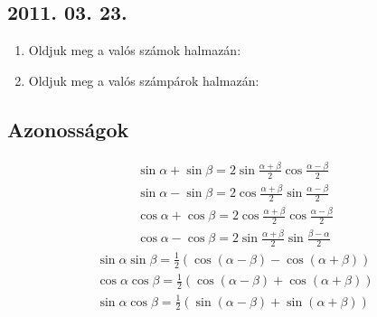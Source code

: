 \subsection*{2011. 03. 23.}
\begin{enumerate}
\item Oldjuk meg a valós számok halmazán:
\item Oldjuk meg a valós számpárok halmazán:
\end{enumerate}

\subsection*{Azonosságok} %
\begin{gather*}
\sin\alpha+\sin\beta=2\sin\frac{\alpha+\beta}{2}\cos\frac{\alpha-\beta}{2}\\
\sin\alpha-\sin\beta=2\cos\frac{\alpha+\beta}{2}\sin\frac{\alpha-\beta}{2}\\
\cos\alpha+\cos\beta=2\cos\frac{\alpha+\beta}{2}\cos\frac{\alpha-\beta}{2}\\
\cos\alpha-\cos\beta=2\sin\frac{\alpha+\beta}{2}\sin\frac{\beta-\alpha}{2}
\end{gather*}
\begin{gather*}
\sin\alpha\sin\beta=\frac12(\cos(\alpha-\beta)-\cos(\alpha+\beta))\\
\cos\alpha\cos\beta=\frac12(\cos(\alpha-\beta)+\cos(\alpha+\beta))\\
\sin\alpha\cos\beta=\frac12(\sin(\alpha-\beta)+\sin(\alpha+\beta))
\end{gather*}

